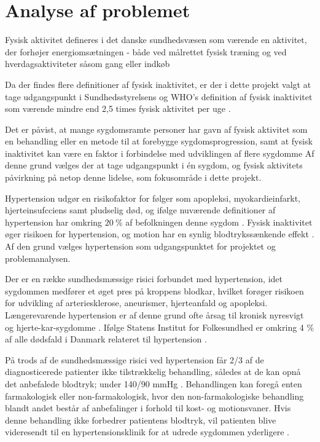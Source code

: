 \section{Analyse af problemet}
Fysisk aktivitet defineres i det danske sundhedsvæsen som værende en aktivitet, der forhøjer energiomsætningen - både ved målrettet fysisk træning og ved hverdagsaktiviteter såsom gang eller indkøb \citep{motionsraad2007, terkelsen2015}

Da der findes flere definitioner af fysisk inaktivitet, er der i dette projekt valgt at tage udgangspunkt i Sundhedsstyrelsens og WHO's definition af fysisk inaktivitet som værende mindre end 2,5 times fysisk aktivitet per uge \citep{motionsraad2007}. 

Det er påvist, at mange sygdomsramte personer har gavn af fysisk aktivitet som en behandling eller en metode til at forebygge sygdomsprogression, samt at fysisk inaktivitet kan være en faktor i forbindelse med udviklingen af flere sygdomme \citep{motionsraad2007,pedersen2011}
Af denne grund vælges der at tage udgangspunkt i én sygdom, og fysisk aktivitets påvirkning på netop denne lidelse, som fokusområde i dette projekt.

Hypertension udgør en risikofaktor for følger som apopleksi, myokardieinfarkt, hjerteinsufcciens samt pludselig død, og ifølge nuværende definitioner af hypertension har omkring $20~\%$ af befolkningen denne sygdom \citep{pedersen2011}. Fysisk inaktivitet øger risikoen for hypertension, og motion har en synlig blodtrykssænkende effekt \citep{olsen2015}. Af den grund vælges hypertension som udgangspunktet for projektet og problemanalysen. 

Der er en række sundhedsmæssige risici forbundet med hypertension, idet sygdommen medfører et øget pres på kroppens blodkar, hvilket forøger risikoen for udvikling af arteriesklerose, aneurismer, hjerteanfald og apopleksi. Længerevarende hypertension er af denne grund ofte årsag til kronisk nyresvigt og hjerte-kar-sygdomme \citep{martini2015}. Ifølge Statens Institut for Folkesundhed er omkring 4 \% af alle dødsfald i Danmark relateret til hypertension \citep{juel2006}.

På trods af de sundhedsmæssige risici ved hypertension får 2/3 af de diagnosticerede patienter ikke tilstrækkelig behandling, således at de kan opnå det anbefalede blodtryk; under 140/90 mmHg \citep{martini2015, paulsen2012}. Behandlingen kan foregå enten farmakologisk eller non-farmakologisk, hvor den non-farmakologiske behandling blandt andet består af anbefalinger i forhold til kost- og motionsvaner. Hvis denne behandling ikke forbedrer patientens blodtryk, vil patienten blive videresendt til en hypertensionsklinik for at udrede sygdommen yderligere \cite{lodberg2016, bech2015}.

